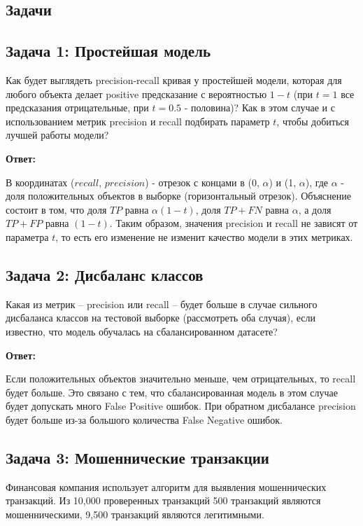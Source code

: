 \subsection*{Задачи}

\subsection*{Задача 1: Простейшая модель}

Как будет выглядеть precision-recall кривая у простейшей модели, которая для любого объекта делает positive предсказание с вероятностью $1-t$ (при $t = 1$ все предсказания отрицательные, при $t = 0.5$ - половина)? Как в этом случае и с использованием метрик precision и recall подбирать параметр $t$, чтобы добиться лучшей работы модели?

\textbf{Ответ:}

В координатах ($recall$, $precision$) - отрезок с концами в (0, $\alpha$) и (1, $\alpha$), где $\alpha$ - доля положительных объектов в выборке (горизонтальный отрезок). Объяснение состоит в том, что доля $TP$ равна $\alpha (1-t)$, доля $TP + FN$ равна $\alpha$, а доля $TP + FP$ равна $(1-t)$. Таким образом, значения precision и recall не зависят от параметра $t$, то есть его изменение не изменит качество модели в этих метриках.

\subsection*{Задача 2: Дисбаланс классов}

Какая из метрик -- precision или recall -- будет больше в случае сильного дисбаланса классов на тестовой выборке (рассмотреть оба случая), если известно, что модель обучалась на сбалансированном датасете?

\textbf{Ответ:}

Если положительных объектов значительно меньше, чем отрицательных, то recall будет больше. Это связано с тем, что сбалансированная модель в этом случае будет допускать много False Positive ошибок. При обратном дисбалансе precision будет больше из-за большого количества False Negative ошибок.

\subsection*{Задача 3: Мошеннические транзакции}

Финансовая компания использует алгоритм для выявления мошеннических транзакций. Из 10,000 проверенных транзакций 500 транзакций являются мошенническими, 9,500 транзакций являются легитимными.

